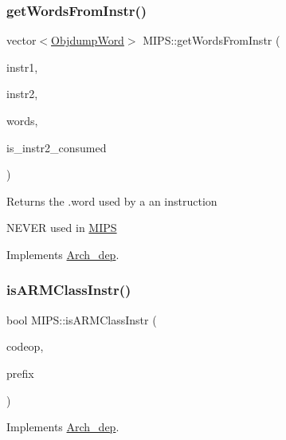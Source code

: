 \subsubsection{\texorpdfstring{get\+Words\+From\+Instr()}{getWordsFromInstr()}}
{\footnotesize\ttfamily vector$<$\hyperlink{classObjdumpWord}{Objdump\+Word}$>$ M\+I\+P\+S\+::get\+Words\+From\+Instr (\begin{DoxyParamCaption}\item[{const \hyperlink{classObjdumpInstruction}{Objdump\+Instruction} \&}]{instr1,  }\item[{const \hyperlink{classObjdumpInstruction}{Objdump\+Instruction} \&}]{instr2,  }\item[{vector$<$ \hyperlink{classObjdumpWord}{Objdump\+Word} $>$}]{words,  }\item[{bool \&}]{is\+\_\+instr2\+\_\+consumed }\end{DoxyParamCaption})\hspace{0.3cm}{\ttfamily [virtual]}}

Returns the .word used by a an instruction

N\+E\+V\+ER used in \hyperlink{classMIPS}{M\+I\+PS} 

Implements \hyperlink{classArch__dep_a00e2fabd6cc0f5b9c36593a67f793d7a}{Arch\+\_\+dep}.

\mbox{\label{classMIPS_aa234e9a3a6942ce0a38894fa4caddbd9}} 
\subsubsection{\texorpdfstring{is\+A\+R\+M\+Class\+Instr()}{isARMClassInstr()}}
{\footnotesize\ttfamily bool M\+I\+P\+S\+::is\+A\+R\+M\+Class\+Instr (\begin{DoxyParamCaption}\item[{const string \&}]{codeop,  }\item[{const string \&}]{prefix }\end{DoxyParamCaption})\hspace{0.3cm}{\ttfamily [virtual]}}



Implements \hyperlink{classArch__dep_a71398abb52e277ead74615af892a2dd8}{Arch\+\_\+dep}.

\mbox{\label{classMIPS_ae645fa32988ae74ef68ee141ee88a434}} 
